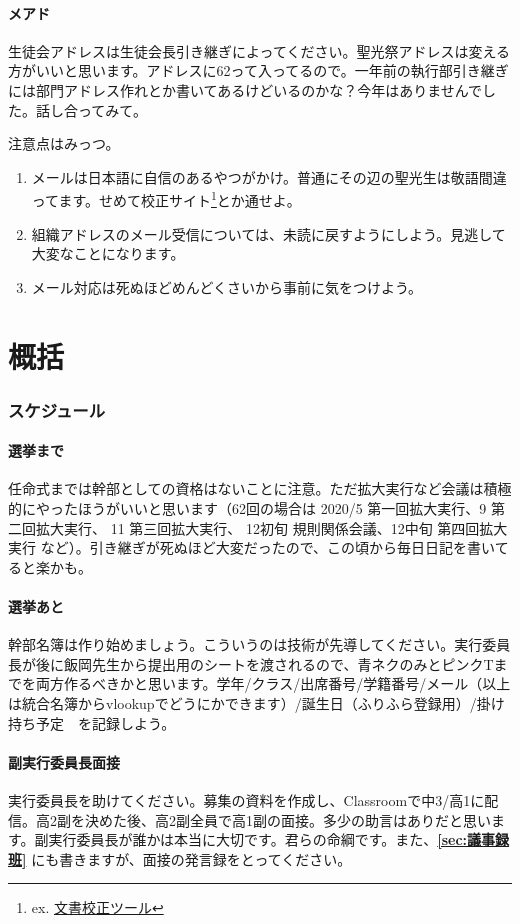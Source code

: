 \documentclass[dvipdfmx,jb5]{jarticle}
\begin{document}
\subsection{メアド}
生徒会アドレスは生徒会長引き継ぎによってください。聖光祭アドレスは変える方がいいと思います。アドレスに62って入ってるので。一年前の執行部引き継ぎには部門アドレス作れとか書いてあるけどいるのかな？今年はありませんでした。話し合ってみて。

注意点はみっつ。
\begin{enumerate}
  \item メールは日本語に自信のあるやつがかけ。普通にその辺の聖光生は敬語間違ってます。せめて校正サイト\footnote{ex. \href{https://so-zou.jp/web-app/text/proofreading/}{文書校正ツール}}とか通せよ。
  \item 組織アドレスのメール受信については、未読に戻すようにしよう。見逃して大変なことになります。
  \item メール対応は死ぬほどめんどくさいから事前に気をつけよう。
\end{enumerate}

\part{概括}
\section{スケジュール}
\subsection{選挙まで}
任命式までは幹部としての資格はないことに注意。ただ拡大実行など会議は積極的にやったほうがいいと思います（62回の場合は 2020/5 第一回拡大実行、9 第二回拡大実行、 11 第三回拡大実行、 12初旬 規則関係会議、12中旬 第四回拡大実行 など）。引き継ぎが死ぬほど大変だったので、この頃から毎日日記を書いてると楽かも。

\subsection{選挙あと}
幹部名簿は作り始めましょう。こういうのは技術が先導してください。実行委員長が後に飯岡先生から提出用のシートを渡されるので、青ネクのみとピンクTまでを両方作るべきかと思います。学年/クラス/出席番号/学籍番号/メール（以上は統合名簿からvlookupでどうにかできます）/誕生日（ふりふら登録用）/掛け持ち予定　を記録しよう。

\subsection{副実行委員長面接}
実行委員長を助けてください。募集の資料を作成し、Classroomで中3/高1に配信。高2副を決めた後、高2副全員で高1副の面接。多少の助言はありだと思います。副実行委員長が誰かは本当に大切です。君らの命綱です。また、{\bf \ref{sec:議事録班}} にも書きますが、面接の発言録をとってください。
\end{document}
